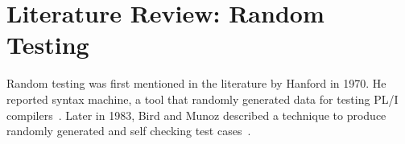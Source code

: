 \chapter{Literature Review: Random Testing}
\label{chap:randomTesting}


Random testing was first mentioned in the literature by Hanford in 1970. He reported syntax machine, a tool that randomly generated data for testing PL/I compilers~\cite{hanford1970automatic}. Later in 1983, Bird and Munoz described a technique to produce randomly generated and self checking test cases~\cite{bird1983automatic}. 



